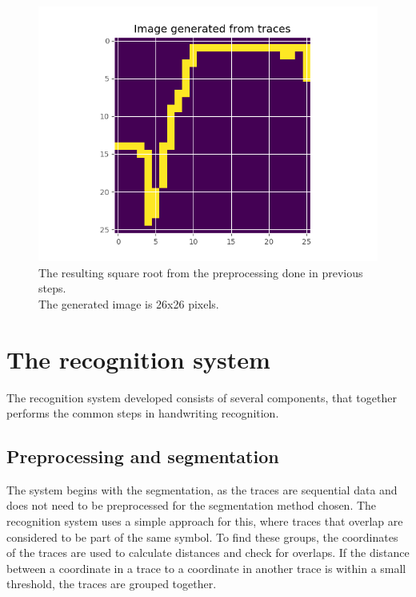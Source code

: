 \begin{figure}[H]
    \centering
    \includegraphics[width=\linewidth,keepaspectratio]{Assets/Chapter3_Method/sqrt_image.png}
    \caption{The resulting square root from the preprocessing done in previous steps.\\The generated image is 26x26 pixels.}
    \label{fig:sqrt_img}
\end{figure}

\section{The recognition system}
\label{the_recognintion_system}
The recognition system developed consists of several components, that together performs the common steps in handwriting recognition.

\subsection{Preprocessing and segmentation}
\label{preprocessing_and_segmentation}

The system begins with the segmentation, as the traces are sequential data and does not need to be preprocessed for the segmentation method chosen. The recognition system uses a simple approach for this, where traces that overlap are considered to be part of the same symbol. To find these groups, the coordinates of the traces are used to calculate distances and check for overlaps. If the distance between a coordinate in a trace to a coordinate in another trace is within a small threshold, the traces are grouped together.

